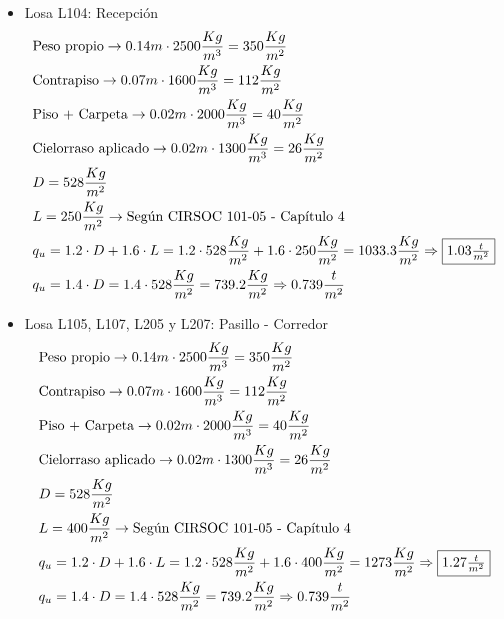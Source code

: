 \begin{enumerate}
\begin{itemize}
\item Losa L104: Recepción
\begin{align*}
& \text{Peso propio} \rightarrow 0.14m \cdot 2500 \frac{Kg}{m^3} = 350 \frac{Kg}{m^2}\\
& \text{Contrapiso} \rightarrow 0.07m \cdot 1600 \frac{Kg}{m^3} = 112 \frac{Kg}{m^2}\\
& \text{Piso + Carpeta} \rightarrow 0.02m \cdot 2000 \frac{Kg}{m^3} = 40 \frac{Kg}{m^2}\\
& \text{Cielorraso aplicado} \rightarrow  0.02m \cdot 1300 \frac{Kg}{m^3} = 26 \frac{Kg}{m^2}\\
& D = 528 \frac{Kg}{m^2}\\
& L = 250 \frac{Kg}{m^2} \rightarrow \text{Según CIRSOC 101-05 - Capítulo 4}\\
& q_u = 1.2 \cdot D + 1.6 \cdot L = 1.2 \cdot 528 \frac{Kg}{m^2} + 1.6 \cdot 250 \frac{Kg}{m^2} = 1033.3 \frac{Kg}{m^2} \Rightarrow \framebox{$1.03 \frac{t}{m^2}$} \\
& q_u = 1.4 \cdot D = 1.4 \cdot 528 \frac{Kg}{m^2} = 739.2 \frac{Kg}{m^2} \Rightarrow 0.739 \frac{t}{m^2}
\end{align*}

\item Losa L105, L107, L205 y L207: Pasillo - Corredor
\begin{align*}
& \text{Peso propio} \rightarrow 0.14m \cdot 2500 \frac{Kg}{m^3} = 350 \frac{Kg}{m^2}\\
& \text{Contrapiso} \rightarrow 0.07m \cdot 1600 \frac{Kg}{m^3} = 112 \frac{Kg}{m^2}\\
& \text{Piso + Carpeta} \rightarrow 0.02m \cdot 2000 \frac{Kg}{m^3} = 40 \frac{Kg}{m^2}\\
& \text{Cielorraso aplicado} \rightarrow  0.02m \cdot 1300 \frac{Kg}{m^3} = 26 \frac{Kg}{m^2}\\
& D = 528 \frac{Kg}{m^2}\\
& L = 400 \frac{Kg}{m^2} \rightarrow \text{Según CIRSOC 101-05 - Capítulo 4}\\
& q_u = 1.2 \cdot D + 1.6 \cdot L = 1.2 \cdot 528 \frac{Kg}{m^2} + 1.6 \cdot 400 \frac{Kg}{m^2} = 1273 \frac{Kg}{m^2} \Rightarrow \framebox{$1.27 \frac{t}{m^2}$} \\
& q_u = 1.4 \cdot D = 1.4 \cdot 528 \frac{Kg}{m^2} = 739.2 \frac{Kg}{m^2} \Rightarrow 0.739 \frac{t}{m^2}
\end{align*}


\end{itemize}
\end{enumerate}
